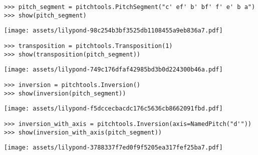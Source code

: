 \begin{comment}
<abjad>
pitch_segment = pitchtools.PitchSegment("c' ef' b' bf' f' e' b a")
show(pitch_segment)
</abjad>
\end{comment}

\begin{abjadbookoutput}
\begin{singlespacing}
\vspace{-0.5\baselineskip}
\begin{lstlisting}
>>> pitch_segment = pitchtools.PitchSegment("c' ef' b' bf' f' e' b a")
>>> show(pitch_segment)
\end{lstlisting}
\noindent\texttt{[image: assets/lilypond-98c254b3bf3525db1108455a9eb836a7.pdf]}
\end{singlespacing}
\end{abjadbookoutput}

\begin{comment}
<abjad>
transposition = pitchtools.Transposition(1)
show(transposition(pitch_segment))
</abjad>
\end{comment}

\begin{abjadbookoutput}
\begin{singlespacing}
\vspace{-0.5\baselineskip}
\begin{lstlisting}
>>> transposition = pitchtools.Transposition(1)
>>> show(transposition(pitch_segment))
\end{lstlisting}
\noindent\texttt{[image: assets/lilypond-749c176dfaf42985bd3b0d224300b46a.pdf]}
\end{singlespacing}
\end{abjadbookoutput}

\begin{comment}
<abjad>
inversion = pitchtools.Inversion()
show(inversion(pitch_segment))
inversion_with_axis = pitchtools.Inversion(axis=NamedPitch("d'"))
show(inversion_with_axis(pitch_segment))
</abjad>
\end{comment}

\begin{abjadbookoutput}
\begin{singlespacing}
\vspace{-0.5\baselineskip}
\begin{lstlisting}
>>> inversion = pitchtools.Inversion()
>>> show(inversion(pitch_segment))
\end{lstlisting}
\noindent\texttt{[image: assets/lilypond-f5dccecbacdc176c5636cb8662091fbd.pdf]}
\begin{lstlisting}
>>> inversion_with_axis = pitchtools.Inversion(axis=NamedPitch("d'"))
>>> show(inversion_with_axis(pitch_segment))
\end{lstlisting}
\noindent\texttt{[image: assets/lilypond-3788337f7ed0f9f5205ea317fef25ba7.pdf]}
\end{singlespacing}
\end{abjadbookoutput}

